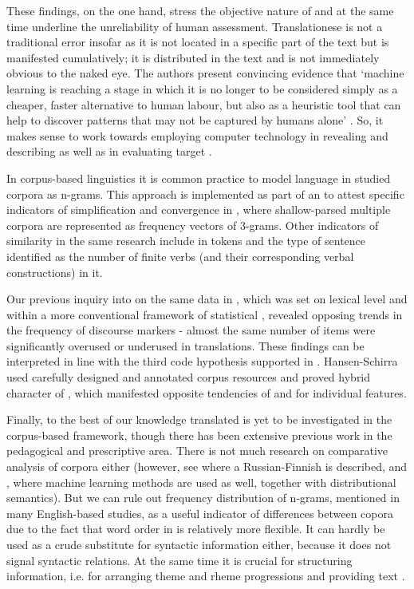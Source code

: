 \documentclass[output=paper]{langsci/langscibook.cls}
\begin{document}
These findings, on the one hand, stress the objective nature of  and at the same time underline the unreliability of human assessment. Translationese is not a traditional error insofar as it is not located in a specific part of the text but is manifested cumulatively; it is distributed in the text and is not immediately obvious to the naked eye. The authors present convincing evidence that `machine learning is reaching a stage in which it is no longer to be considered simply as a cheaper, faster alternative to human labour, but also as a heuristic tool that can help to discover patterns that may not be captured by humans alone' \citep[38]{baroni2005new}. So, it makes sense to work towards employing computer technology in revealing and describing  as well as in evaluating target .  

In corpus-based linguistics it is common practice to model language in studied corpora as  n-grams. This approach is implemented as part of an  to attest specific indicators of simplification and convergence in \citep{pastor2008translation}, where shallow-parsed multiple corpora are represented as frequency vectors of  3-grams. Other indicators of similarity in the same research include  in tokens and the type of sentence identified as the number of finite verbs (and their corresponding verbal constructions) in it.

Our previous inquiry into  on the same data in \citep{Kunilovskaya:2015}, which was set on lexical level and within a more conventional framework of statistical , revealed opposing trends in the frequency of discourse markers - almost the same number of items were significantly overused or underused in translations. These findings can be interpreted in line with the third code hypothesis supported in \citep{hansen2011between}. Han\-sen-Schir\-ra used carefully designed and annotated corpus resources and proved hybrid character of , which manifested opposite tendencies of  and  for individual  features. 

Finally, to the best of our knowledge translated  is yet to be investigated in the corpus-based framework, though there has been extensive previous work in the pedagogical and prescriptive area. There is not much research on comparative analysis of  corpora either (however, see \citealt{mikhailov2003parallel} where a Russian-Finnish  is described, and \citealt{kutuzov2015comparing}, where machine learning methods are used as well, together with distributional semantics). But we can rule out frequency distribution of  n-grams, mentioned in many English-based studies, as a useful indicator of differences between copora due to the fact that word order in  is relatively more flexible. It can hardly be used as a crude substitute for syntactic information either, because it does not signal syntactic relations. At the same time it is crucial for structuring information, i.e. for arranging theme and rheme progressions and providing text  \citep{alekseyenko2013corpus}. 
\end{document}
